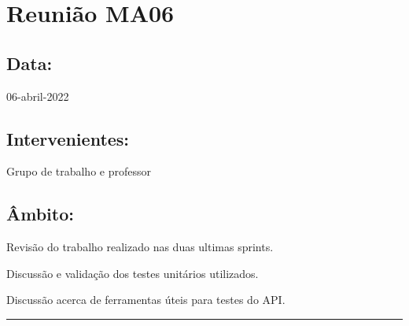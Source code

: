 \section{Reunião MA06}\label{reuniaoMA06}

\subsection*{Data:}
06-abril-2022

\subsection*{Intervenientes:}
Grupo de trabalho e professor

\subsection*{Âmbito:}
Revisão do trabalho realizado nas duas ultimas sprints. 

Discussão e validação dos testes unitários utilizados. 

Discussão acerca de ferramentas úteis para testes do API.

\noindent \rule{\linewidth}{0.4pt}
\newline